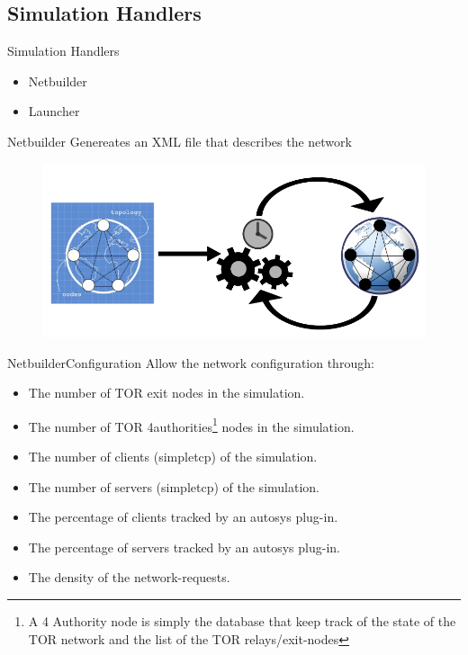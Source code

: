 \subsection{Simulation Handlers}
	\begin{frame}{Simulation Handlers}
		\begin{itemize}
			\item Netbuilder
			\item Launcher
		\end{itemize}
	\end{frame}

	\begin{frame}{Netbuilder}
		Genereates an XML file that describes the network
			
		\begin{figure}
			\centering
			\includegraphics[scale=0.35]{img/design1.png}
		\end{figure}
	\end{frame}

	\begin{frame}{Netbuilder}{Configuration}
		Allow the network configuration through:
		\begin{itemize}
			
			\item The number of TOR exit nodes in the simulation.
			\item The number of TOR 4authorities\footnote{A 4 Authority node is simply the
			database that keep track of the state of the TOR network and the list
			of the TOR relays/exit-nodes} nodes in the simulation.
			\item The number of clients (simpletcp) of the simulation.
			\item The number of servers (simpletcp) of the simulation.
			\item The percentage of clients tracked by an autosys plug-in.
			\item The percentage of servers tracked by an autosys plug-in.
			\item The density of the network-requests.
		\end{itemize}
	\end{frame}	

